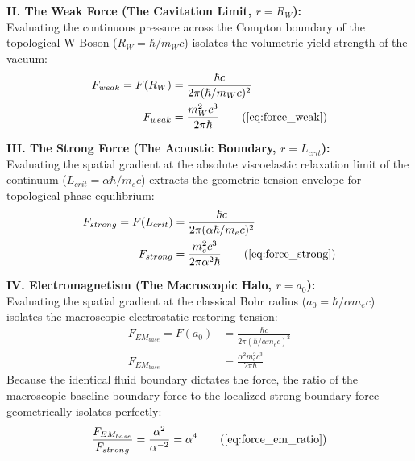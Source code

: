 \documentclass[11pt, a4paper]{article}
\begin{document}
\textbf{II. The Weak Force (The Cavitation Limit, $r = R_W$):} \\
Evaluating the continuous pressure across the Compton boundary of the topological W-Boson ($R_W = \hbar / m_W c$) isolates the volumetric yield strength of the vacuum:
\begin{align}
    F_{weak} = F(R_W) &= \frac{\hbar c}{2\pi (\hbar / m_W c)^2} \nonumber \\
    F_{weak} &= \frac{m_W^2 c^3}{2\pi \hbar} \tag{\ref{eq:force_weak}}
\end{align}

\textbf{III. The Strong Force (The Acoustic Boundary, $r = L_{crit}$):} \\
Evaluating the spatial gradient at the absolute viscoelastic relaxation limit of the continuum ($L_{crit} = \alpha \hbar / m_e c$) extracts the geometric tension envelope for topological phase equilibrium:
\begin{align}
    F_{strong} = F(L_{crit}) &= \frac{\hbar c}{2\pi (\alpha \hbar / m_e c)^2} \nonumber \\
    F_{strong} &= \frac{m_e^2 c^3}{2\pi \alpha^2 \hbar} \tag{\ref{eq:force_strong}}
\end{align}

\textbf{IV. Electromagnetism (The Macroscopic Halo, $r = a_0$):} \\
Evaluating the spatial gradient at the classical Bohr radius ($a_0 = \hbar / \alpha m_e c$) isolates the macroscopic electrostatic restoring tension:
\begin{align}
    F_{EM_{base}} = F(a_0) &= \frac{\hbar c}{2\pi (\hbar / \alpha m_e c)^2} \nonumber \\
    F_{EM_{base}} &= \frac{\alpha^2 m_e^2 c^3}{2\pi \hbar} 
\end{align}
Because the identical fluid boundary dictates the force, the ratio of the macroscopic baseline boundary force to the localized strong boundary force geometrically isolates perfectly:
\begin{equation}
    \frac{F_{EM_{base}}}{F_{strong}} = \frac{\alpha^2}{\alpha^{-2}} = \alpha^4 \tag{\ref{eq:force_em_ratio}}
\end{equation}
\end{document}
